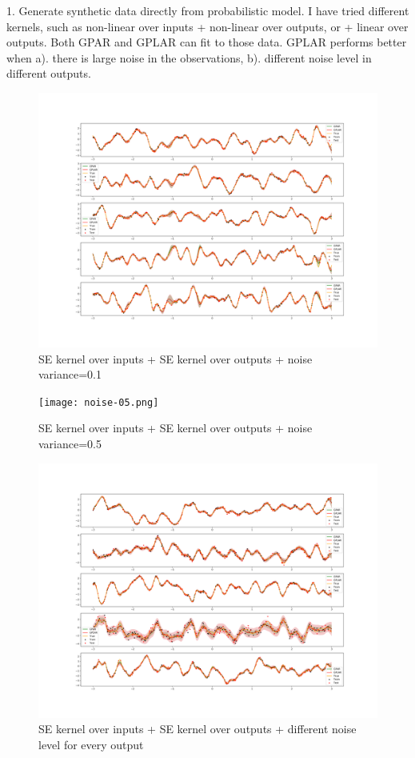 \documentclass{article}
\begin{document}
1.	Generate synthetic data directly from probabilistic model. I have tried different kernels, such as non-linear over inputs + non-linear over outputs, or + linear over outputs. Both GPAR and GPLAR can fit to those data. GPLAR performs better when a). there is large noise in the observations, b). different noise level in different outputs.

\begin{figure}[H]
\centering
\includegraphics[width=.8\linewidth]{noise-01.png}
\caption{SE kernel over inputs + SE kernel over outputs + noise variance=0.1}
\end{figure}

\begin{figure}[H]
\centering
\texttt{[image: noise-05.png]}
\caption{SE kernel over inputs + SE kernel over outputs + noise variance=0.5}
\end{figure}

\begin{figure}[H]
\centering
\includegraphics[width=.8\linewidth]{noise-different.png}
\caption{SE kernel over inputs + SE kernel over outputs + different noise level for every output}
\end{figure}
\end{document}
